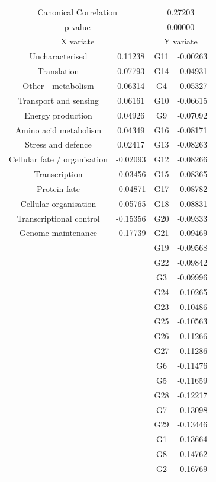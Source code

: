 \begin{figure}[H]
\centering
\begin{tabular}{ c c | c c }
  \multicolumn{2}{c}{Canonical Correlation} &  \multicolumn{2}{c}{0.27203} \\
  \multicolumn{2}{c}{p-value} &  \multicolumn{2}{c}{0.00000} \\
  \hline
  \multicolumn{2}{c}{X variate} & \multicolumn{2}{c}{Y variate}\\
  \hline
 Uncharacterised & 0.11238 &  G11 & -0.00263\\
 Translation & 0.07793 &  G14 & -0.04931\\
 Other - metabolism & 0.06314 &  G4 & -0.05327\\
 Transport and sensing & 0.06161 &  G10 & -0.06615\\
 Energy production & 0.04926 &  G9 & -0.07092\\
 Amino acid metabolism & 0.04349 &  G16 & -0.08171\\
 Stress and defence & 0.02417 &  G13 & -0.08263\\
 Cellular fate / organisation & -0.02093 &  G12 & -0.08266\\
 Transcription & -0.03456 &  G15 & -0.08365\\
 Protein fate & -0.04871 &  G17 & -0.08782\\
 Cellular organisation & -0.05765 &  G18 & -0.08831\\
 Transcriptional control & -0.15356 &  G20 & -0.09333\\
 Genome maintenance & -0.17739 &  G21 & -0.09469\\
 & &  G19 & -0.09568\\
 & &  G22 & -0.09842\\
 & &  G3 & -0.09996\\
 & &  G24 & -0.10265\\
 & &  G23 & -0.10486\\
 & &  G25 & -0.10563\\
 & &  G26 & -0.11266\\
 & &  G27 & -0.11286\\
 & &  G6 & -0.11476\\
 & &  G5 & -0.11659\\
 & &  G28 & -0.12217\\
 & &  G7 & -0.13098\\
 & &  G29 & -0.13446\\
 & &  G1 & -0.13664\\
 & &  G8 & -0.14762\\
 & &  G2 & -0.16769\\

\end{tabular}
\end{figure}
